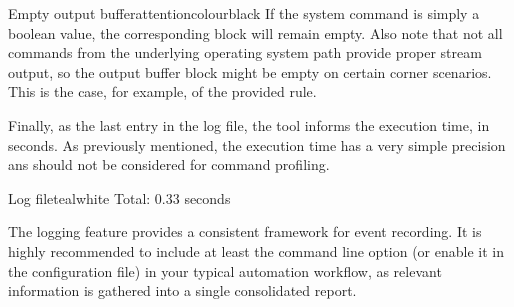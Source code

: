 \begin{messagebox}{Empty output buffer}{attentioncolour}{\icattention}{black}
If the system command is simply a boolean value, the corresponding block will remain empty. Also note that not all commands from the underlying operating system path provide proper stream output, so the output buffer block might be empty on certain corner scenarios. This is the case, for example, of the provided  rule.
\end{messagebox}

Finally, as the last entry in the log file, the tool informs the execution time, in seconds. As previously mentioned, the execution time has a very simple precision ans should not be considered for command profiling.

\begin{codebox}{Log file}{teal}{\icnote}{white}
Total: 0.33 seconds
\end{codebox}

The logging feature provides a consistent framework for event recording. It is highly recommended to include at least the  command line option (or enable it in the configuration file) in your typical automation workflow, as relevant information is gathered into a single consolidated report.
